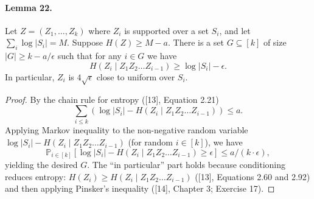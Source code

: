 \paragraph{Lemma 22.}
Let $Z=(Z_1,\ldots,Z_k)$ where $Z_i$ is supported over a set $S_i$, and let $\sum_i\log|S_i|=M$. Suppose $H(Z)\geq M-a$. There is a set $G\subseteq[k]$ of size $|G|\geq k-a/\epsilon$ such that for any $i\in G$ we have
\[H(Z_i\mid Z_1Z_2\ldots Z_{i-1})\geq\log|S_i|-\epsilon.\]
In particular, $Z_i$ is $4\sqrt\epsilon$ close to uniform over $S_i$.
\begin{proof}
By the chain rule for entropy ([13], Equation 2.21)
\[\sum_{i\leq k}(\log|S_i|-H(Z_i\mid Z_1Z_2\ldots Z_{i-1}))\leq a.\]
Applying Markov inequality to the non-negative random variable $\log|S_i|-H(Z_i\mid Z_1Z_2\ldots Z_{i-1})$ (for random $i\in[k]$), we have
\[\mathbb P_{i\in[k]}[\log|S_i|-H(Z_i\mid Z_1Z_2\ldots Z_{i-1})\geq\epsilon]\leq a/(k\cdot\epsilon),\]
yielding the desired $G$.
The ``in particular'' part holds because conditioning reduces entropy: $H(Z_i)\geq H(Z_i\mid Z_1Z_2\ldots Z_{i-1})$ ([13], Equations 2.60 and 2.92) and then applying Pinsker's inequality ([14], Chapter 3; Exercise 17).
\end{proof}
